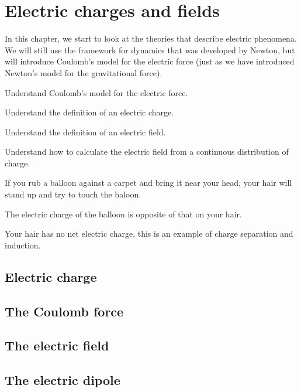 
\chapter{Electric charges and fields}
\label{chapter:chargesfields}
In this chapter, we start to look at the theories that describe electric phenomena. We will still use the framework for dynamics that was developed by Newton, but will introduce Coulomb's model for the electric force (just as we have introduced Newton's model for the gravitational force). 

\begin{learningObjectives}{
 \item Understand Coulomb's model for the electric force.
 \item Understand the definition of an electric charge.
 \item Understand the definition of an electric field.
 \item Understand how to calculate the electric field from a continuous distribution of charge.
 }
\end{learningObjectives}

\begin{opening}
\begin{MCquestion}{If you rub a balloon against a carpet and bring it near your head, your hair will stand up and try to touch the baloon.}
\item The electric charge of the balloon is opposite of that on your hair.
\item Your hair has no net electric charge, this is an example of charge separation and induction. \correct
\end{MCquestion}
\end{opening}

\section{Electric charge}

\section{The Coulomb force}

\section{The electric field}

\section{The electric dipole}


